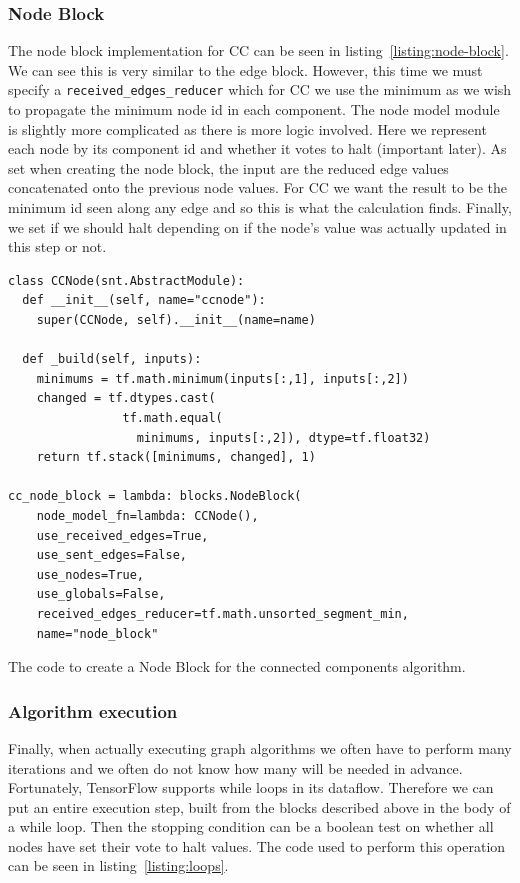 \documentclass[sigconf,nonacm]{acmart}
\begin{document}
\subsubsection{Node Block}

The node block implementation for CC can be seen in listing~\ref{listing:node-block}. We can see this is very similar to the edge block. However, this time we must specify a \texttt{received\_edges\_reducer} which for CC we use the minimum as we wish to propagate the minimum node id in each component. The node model module is slightly more complicated as there is more logic involved. Here we represent each node by its component id and whether it votes to halt (important later). As set when creating the node block, the input are the reduced edge values concatenated onto the previous node values. For CC we want the result to be the minimum id seen along any edge and so this is what the calculation finds. Finally, we set if we should halt depending on if the node's value was actually updated in this step or not.

\begin{listing}[ht]
\small{}
\begin{verbatim}
class CCNode(snt.AbstractModule):
  def __init__(self, name="ccnode"):
    super(CCNode, self).__init__(name=name)

  def _build(self, inputs):
    minimums = tf.math.minimum(inputs[:,1], inputs[:,2])
    changed = tf.dtypes.cast(
                tf.math.equal(
                  minimums, inputs[:,2]), dtype=tf.float32)
    return tf.stack([minimums, changed], 1)
                          
cc_node_block = lambda: blocks.NodeBlock(
    node_model_fn=lambda: CCNode(),
    use_received_edges=True,
    use_sent_edges=False,
    use_nodes=True,
    use_globals=False,
    received_edges_reducer=tf.math.unsorted_segment_min,
    name="node_block"
\end{verbatim}
\caption{The code to create a Node Block for the connected components algorithm.}
\label{listing:node-block}
\end{listing}

\subsubsection{Algorithm execution}

Finally, when actually executing graph algorithms we often have to perform many iterations and we often do not know how many will be needed in advance. Fortunately, TensorFlow supports while loops in its dataflow. Therefore we can put an entire execution step, built from the blocks described above in the body of a while loop. Then the stopping condition can be a boolean test on whether all nodes have set their vote to halt values. The code used to perform this operation can be seen in listing~\ref{listing:loops}.
\end{document}
